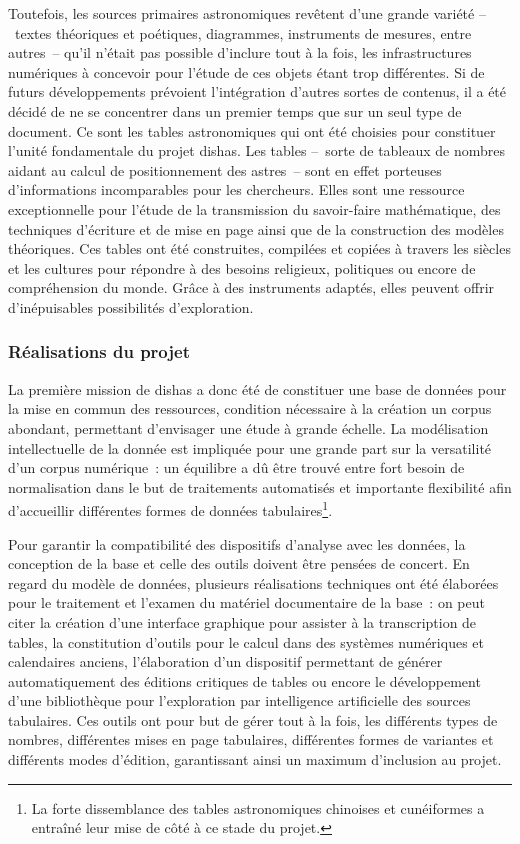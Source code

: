 \documentclass[a4paper,12pt,twoside]{book}
\newcommand{\dishas}{\gls{dishas}\xspace}
\begin{document}
Toutefois, les sources primaires astronomiques revêtent d'une grande variété –~textes théoriques et poétiques, diagrammes, instruments de mesures, entre autres~– qu'il n'était pas possible d'inclure tout à la fois, les infrastructures numériques à concevoir pour l'étude de ces objets étant trop différentes. Si de futurs développements prévoient l'intégration d'autres sortes de contenus, il a été décidé de ne se concentrer dans un premier temps que sur un seul type de document. Ce sont les tables astronomiques qui ont été choisies pour constituer l'unité fondamentale du projet \dishas. Les tables –~sorte de tableaux de nombres aidant au calcul de positionnement des astres~– sont en effet porteuses d'informations incomparables pour les chercheurs. Elles sont une ressource exceptionnelle pour l'étude de la transmission du savoir-faire mathématique, des techniques d'écriture et de mise en page ainsi que de la construction des modèles théoriques. Ces tables ont été construites, compilées et copiées à travers les siècles et les cultures pour répondre à des besoins religieux, politiques ou encore de compréhension du monde. Grâce à des instruments adaptés, elles peuvent offrir d'inépuisables possibilités d'exploration.

			\subsubsection{Réalisations du projet}
La première mission de \dishas a donc été de constituer une base de données pour la mise en commun des ressources, condition nécessaire à la création un corpus abondant, permettant d'envisager une étude à grande échelle. La modélisation intellectuelle de la donnée est impliquée pour une grande part sur la versatilité d'un corpus numérique~: un équilibre a dû être trouvé entre fort besoin de normalisation dans le but de traitements automatisés et importante flexibilité afin d'accueillir différentes formes de données tabulaires\footnote{La forte dissemblance des tables astronomiques chinoises et cunéiformes a entraîné leur mise de côté à ce stade du projet.}.

Pour garantir la compatibilité des dispositifs d'analyse avec les données, la conception de la base et celle des outils doivent être pensées de concert. En regard du modèle de données, plusieurs réalisations techniques ont été élaborées pour le traitement et l'examen du matériel documentaire de la base~: on peut citer la création d'une interface graphique pour assister à la transcription de tables, la constitution d'outils pour le calcul dans des systèmes numériques et calendaires anciens, l'élaboration d'un dispositif permettant de générer automatiquement des éditions critiques de tables ou encore le développement d'une bibliothèque pour l'exploration par intelligence artificielle des sources tabulaires. Ces outils ont pour but de gérer tout à la fois, les différents types de nombres, différentes mises en page tabulaires, différentes formes de variantes et différents modes d'édition, garantissant ainsi un maximum d'inclusion au projet.
\end{document}
